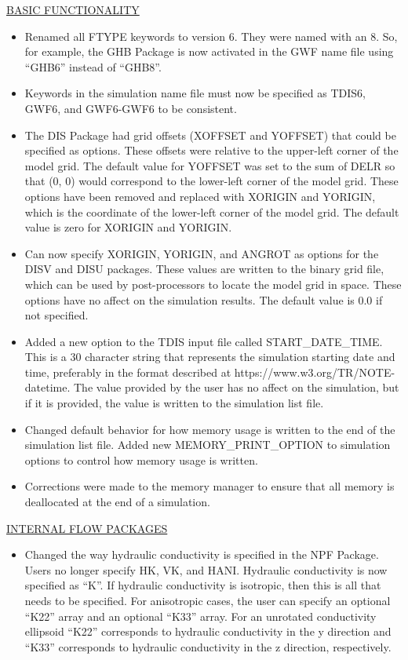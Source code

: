 \documentclass[11pt,twoside,twocolumn]{usgsreport}
\begin{document}
\begin{itemize}
\underline{BASIC FUNCTIONALITY}
\begin{itemize}
\item Renamed all FTYPE keywords to version 6.  They were named with an 8.  So, for example, the GHB Package is now activated in the GWF name file using ``GHB6'' instead of ``GHB8''.
\item Keywords in the simulation name file must now be specified as TDIS6, GWF6, and GWF6-GWF6 to be consistent.
\item The DIS Package had grid offsets (XOFFSET and YOFFSET) that could be specified as options.  These offsets were relative to the upper-left corner of the model grid.  The default value for YOFFSET was set to the sum of DELR so that (0, 0) would correspond to the lower-left corner of the model grid.  These options have been removed and replaced with XORIGIN and YORIGIN, which is the coordinate of the lower-left corner of the model grid.  The default value is zero for XORIGIN and YORIGIN.
\item Can now specify XORIGIN, YORIGIN, and ANGROT as options for the DISV and DISU packages.  These values are written to the binary grid file, which can be used by post-processors to locate the model grid in space.  These options have no affect on the simulation results.  The default value is 0.0 if not specified.
\item Added a new option to the TDIS input file called START\_DATE\_TIME.  This is a 30 character string that represents the simulation starting date and time, preferably in the format described at https://www.w3.org/TR/NOTE-datetime.  The value provided by the user has no affect on the simulation, but if it is provided, the value is written to the simulation list file.
\item Changed default behavior for how memory usage is written to the end of the simulation list file.  Added new MEMORY\_PRINT\_OPTION to simulation options to control how memory usage is written.
\item Corrections were made to the memory manager to ensure that all memory is deallocated at the end of a simulation.
\end{itemize}

\underline{INTERNAL FLOW PACKAGES}
\begin{itemize}
\item Changed the way hydraulic conductivity is specified in the NPF Package.  Users no longer specify HK, VK, and HANI.  Hydraulic conductivity is now specified as ``K''.  If hydraulic conductivity is isotropic, then this is all that needs to be specified.  For anisotropic cases, the user can specify an optional ``K22'' array and an optional ``K33'' array.  For an unrotated conductivity ellipsoid ``K22'' corresponds to hydraulic conductivity in the y direction and ``K33'' corresponds to hydraulic conductivity in the z direction, respectively.
\end {itemize}


\end{itemize}
\end{document}
